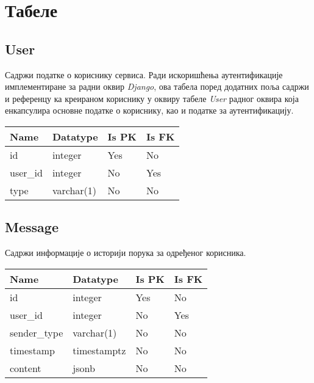 \section{Табеле}
\subsection{User}

Садржи податке о кориснику сервиса. Ради искоришћења аутентификације имплементиране за радни оквир 
\textit{Django}, ова табела поред додатних поља садржи и референцу ка креираном кориснику у оквиру
табеле \textit{User} радног оквира која енкапсулира основне податке о кориснику, као и податке за
аутентификацију.

\vspace{0.5cm}

\noindent
\setcellgapes{4pt}
\makegapedcells
\begin{tabularx}{\linewidth}{|X|X|X|X|}
    \hline
    \textbf{Name} & \textbf{Datatype} & \textbf{Is PK} & \textbf{Is FK} \\
    \hline
    id & integer & Yes & No \\
    \hline
    user\_id & integer & No & Yes \\
    \hline
    type & varchar(1) & No & No \\
    \hline
\end{tabularx}

\subsection{Message}

Садржи информације о историји порука за одређеног корисника.

\vspace{0.5cm}

\noindent
\setcellgapes{4pt}
\makegapedcells
\begin{tabularx}{\linewidth}{|X|X|X|X|}
    \hline
    \textbf{Name} & \textbf{Datatype} & \textbf{Is PK} & \textbf{Is FK} \\
    \hline
    id & integer & Yes & No \\
    \hline
    user\_id & integer & No & Yes \\
    \hline
    sender\_type & varchar(1) & No & No \\
    \hline
    timestamp & timestamptz & No & No \\
    \hline
    content & jsonb & No & No \\
    \hline
\end{tabularx}

